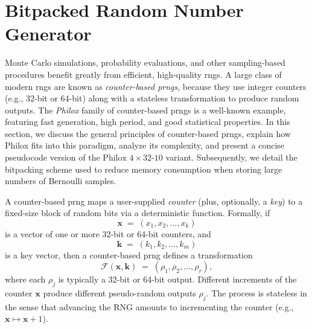 \chapter{Bitpacked Random Number Generator}

Monte Carlo simulations, probability evaluations, and other sampling-based procedures benefit greatly from efficient, high-quality \acrfull{rng}s. A large class of modern \acrshort{rng}s are known as \textit{counter-based \acrfull{prng}s}, because they use integer counters (e.g., 32-bit or 64-bit) along with a stateless transformation to produce random outputs. The \emph{Philox} family of counter-based \acrshort{prng}s is a well-known example, featuring fast generation, high period, and good statistical properties. In this section, we discuss the general principles of counter-based \acrshort{prng}s, explain how Philox fits into this paradigm, analyze its complexity, and present a concise pseudocode version of the \(\text{Philox }4\times32\text{-10}\) variant. Subsequently, we detail the bitpacking scheme used to reduce memory consumption when storing large numbers of Bernoulli samples.

A counter-based \acrshort{prng} maps a user-supplied \emph{counter} (plus, optionally, a \emph{key}) to a fixed-size block of random bits via a deterministic function. Formally, if 
\[
  \mathbf{x} \;=\; (x_1, x_2, \ldots, x_k)
\]
is a vector of one or more 32-bit or 64-bit counters, and 
\[
  \mathbf{k} \;=\; (k_1, k_2, \ldots, k_m)
\]
is a key vector, then a counter-based \acrshort{prng} defines a transformation 
\[
   \mathcal{F}(\mathbf{x}, \mathbf{k})
   \;=\;
   (\rho_1, \rho_2, \ldots, \rho_r),
\]
where each \(\rho_j\) is typically a 32-bit or 64-bit output. Different increments of the counter \(\mathbf{x}\) produce different pseudo-random outputs \(\rho_j\). The process is stateless in the sense that advancing the RNG amounts to incrementing the counter (e.g., \(\mathbf{x}\mapsto \mathbf{x} + 1\)).


